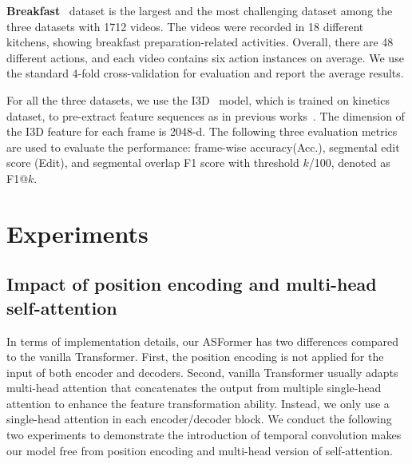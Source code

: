 \documentclass{bmvc2k}
\begin{document}
\noindent
\textbf{Breakfast}~\cite{breakfast} dataset is the largest and the most challenging dataset among the three datasets with 1712 videos. The videos were recorded in 18 different kitchens, showing breakfast preparation-related activities. Overall, there are 48 different actions, and each video contains six action instances on average. We use the standard 4-fold cross-validation for evaluation and report the average results.

\noindent
For all the three datasets, we use the I3D~\cite{kinetics:i3d} model, which is trained on kinetics~\cite{kinetics:i3d} dataset, to pre-extract feature sequences as in previous works~\cite{MSTCN,Dai,BCN,GCN1,GCN2,ED-TCN}. The dimension of the I3D feature for each frame is 2048-d. The following three evaluation metrics are used to evaluate the performance: frame-wise accuracy(Acc.), segmental edit score (Edit), and segmental overlap F1 score with threshold $k$/100, denoted as F1@$k$. 


\section{Experiments}
\subsection{Impact of position encoding and multi-head self-attention}
In terms of implementation details, our ASFormer has two differences compared to the vanilla Transformer. First, the position encoding is not applied for the input of both encoder and decoders. Second, vanilla Transformer usually adapts multi-head attention that concatenates the output from multiple single-head attention to enhance the feature transformation ability. Instead, we only use a single-head attention in each encoder/decoder block. We conduct the following two experiments to demonstrate the introduction of temporal convolution makes our model free from position encoding and multi-head version of self-attention.
\end{document}
